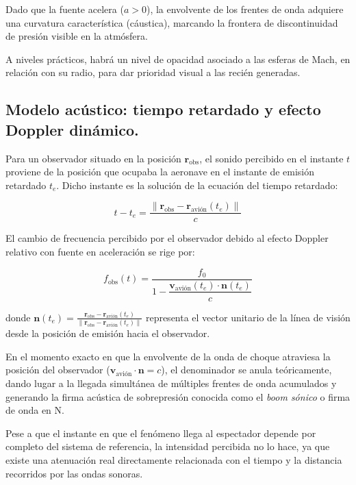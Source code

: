 \documentclass[10.5pt]{article}
\begin{document}
	Dado que la fuente acelera ($a > 0$), la envolvente de los frentes de onda adquiere una curvatura característica (cáustica), marcando la frontera de discontinuidad de presión visible en la atmósfera.
	
	A niveles prácticos, habrá un nivel de opacidad asociado a las esferas de Mach, en relación con su radio, para dar prioridad visual a las recién generadas.
	
	\subsection{Modelo acústico: tiempo retardado y efecto Doppler dinámico.}
	
	Para un observador situado en la posición $\mathbf{r}_{\text{obs}}$, el sonido percibido en el instante $t$ proviene de la posición que ocupaba la aeronave en el instante de emisión retardado $t_e$. Dicho instante es la solución de la ecuación del tiempo retardado:
	
	\begin{equation*}
		t - t_e = \frac{\|\mathbf{r}_{\text{obs}} - \mathbf{r}_{\text{avión}}(t_e)\|}{c}
	\end{equation*}
	
	El cambio de frecuencia percibido por el observador debido al efecto Doppler relativo con fuente en aceleración se rige por:
	
	\begin{equation*}
		f_{\text{obs}}(t) = \frac{f_0}{1 - \dfrac{\mathbf{v}_{\text{avión}}(t_e) \cdot \mathbf{n}(t_e)}{c}}
	\end{equation*}
	
	donde $\mathbf{n}(t_e) = \frac{\mathbf{r}_{\text{obs}} - \mathbf{r}_{\text{avión}}(t_e)}{\|\mathbf{r}_{\text{obs}} - \mathbf{r}_{\text{avión}}(t_e)\|}$ representa el vector unitario de la línea de visión desde la posición de emisión hacia el observador.
	
	En el momento exacto en que la envolvente de la onda de choque atraviesa la posición del observador ($\mathbf{v}_{\text{avión}} \cdot \mathbf{n} = c$), el denominador se anula teóricamente, dando lugar a la llegada simultánea de múltiples frentes de onda acumulados y generando la firma acústica de sobrepresión conocida como el \textit{boom sónico} o firma de onda en N.
	
	Pese a que el instante en que el fenómeno llega al espectador depende por completo del sistema de referencia, la intensidad percibida no lo hace, ya que existe una atenuación real directamente relacionada con el tiempo y la distancia recorridos por las ondas sonoras.
	
\end{document}
